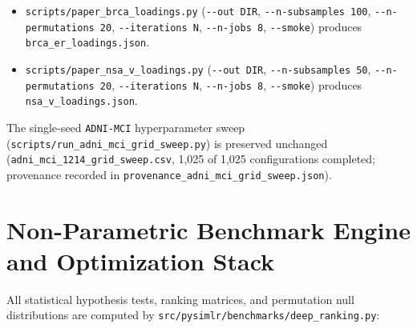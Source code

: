 \documentclass[
  10pt,
  letterpaper,
]{report}
\begin{document}
\begin{itemize}
  \texttt{scripts/adni\_rank\_selection.py} (\texttt{-\/-out\ CSV},
  \texttt{-\/-ks\ 2\ 3\ 4\ 5}, \texttt{-\/-n-subsamples\ 20},
  \texttt{-\/-n-baseline\ 3}, \texttt{-\/-iterations\ N},
  \texttt{-\/-n-jobs\ 8}, \texttt{-\/-smoke}) produces
  \texttt{docs/audit/evidence/adni\_rank\_selection.csv} and
  \texttt{adni\_rank\_selection\_provenance.json}.
\item
  \texttt{scripts/paper\_brca\_loadings.py} (\texttt{-\/-out\ DIR},
  \texttt{-\/-n-subsamples\ 100}, \texttt{-\/-n-permutations\ 20},
  \texttt{-\/-iterations\ N}, \texttt{-\/-n-jobs\ 8},
  \texttt{-\/-smoke}) produces \texttt{brca\_er\_loadings.json}.
\item
  \texttt{scripts/paper\_nsa\_v\_loadings.py} (\texttt{-\/-out\ DIR},
  \texttt{-\/-n-subsamples\ 50}, \texttt{-\/-n-permutations\ 20},
  \texttt{-\/-iterations\ N}, \texttt{-\/-n-jobs\ 8},
  \texttt{-\/-smoke}) produces \texttt{nsa\_v\_loadings.json}.
\end{itemize}

The single-seed \texttt{ADNI-MCI} hyperparameter sweep
(\texttt{scripts/run\_adni\_mci\_grid\_sweep.py}) is preserved unchanged
(\texttt{adni\_mci\_1214\_grid\_sweep.csv}, 1,025 of 1,025
configurations completed; provenance recorded in
\texttt{provenance\_adni\_mci\_grid\_sweep.json}).

\section{Non-Parametric Benchmark Engine and Optimization
Stack}\label{non-parametric-benchmark-engine-and-optimization-stack}

All statistical hypothesis tests, ranking matrices, and permutation null
distributions are computed by
\texttt{src/pysimlr/benchmarks/deep\_ranking.py}:
\end{document}
